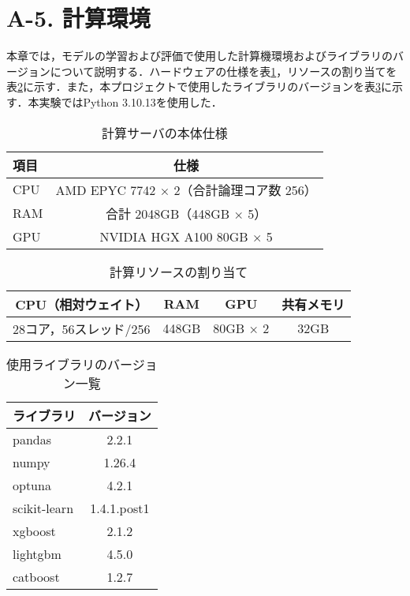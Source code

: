 \section*{A-5. 計算環境}
本章では，モデルの学習および評価で使用した計算機環境およびライブラリのバージョンについて説明する．ハードウェアの仕様を表\ref{tab:server_specs}，リソースの割り当てを表\ref{tab:resource_allocation}に示す．また，本プロジェクトで使用したライブラリのバージョンを表\ref{tab:versions}に示す．本実験ではPython 3.10.13を使用した．
\begin{table}[htbp]
    \centering
    \doublerulesep=0.3pt
    \caption{計算サーバの本体仕様}
    \label{tab:server_specs}
    \begin{tabular}{l|c}
        \hline\hline\hline
        項目 & 仕様 \\
        \hline
        CPU  & AMD EPYC 7742 × 2（合計論理コア数 256） \\
        RAM  & 合計 2048GB（448GB × 5） \\
        GPU  & NVIDIA HGX A100 80GB × 5 \\
        \hline\hline\hline
    \end{tabular}
\end{table}

\begin{table}[htbp]
    \centering
    \doublerulesep=0.3pt
    \caption{計算リソースの割り当て}
    \label{tab:resource_allocation}
    \begin{tabular}{c|c|c|c}
        \hline\hline\hline
        CPU（相対ウェイト） & RAM & GPU & 共有メモリ \\
        \hline
        28コア，56スレッド/256 & 448GB & 80GB × 2 & 32GB  \\
        \hline\hline\hline
    \end{tabular}
\end{table}

\begin{table}[htbp]
    \centering
    \doublerulesep=0.3pt
    \caption{使用ライブラリのバージョン一覧}
    \label{tab:versions}
    \begin{tabular}{l|c}
        \hline\hline\hline
        ライブラリ & バージョン \\
        \hline
        pandas & 2.2.1 \\
        numpy & 1.26.4 \\
        optuna & 4.2.1 \\
        scikit-learn & 1.4.1.post1 \\
        xgboost & 2.1.2 \\
        lightgbm & 4.5.0 \\
        catboost & 1.2.7 \\
        \hline\hline\hline
    \end{tabular}
\end{table}

